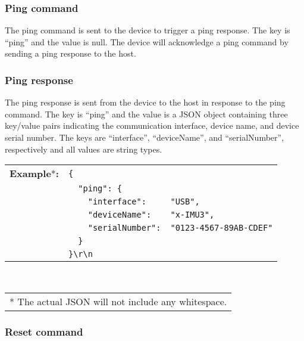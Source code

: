 \subsubsection{Ping command}

The ping command is sent to the device to trigger a ping response.  The key is \enquote{ping} and the value is null.  The device will acknowledge a ping command by sending a ping response to the host.


\subsubsection{Ping response}

The ping response is sent from the device to the host in response to the ping command.  The key is \enquote{ping} and the value is a \ac{JSON} object containing three key/value pairs indicating the communication interface, device name, and device serial number.  The keys are \enquote{interface}, \enquote{deviceName}, and \enquote{serialNumber}, respectively and all values are string types.

\begin{table}[H]
    \begin{tabular}{l l l}
        \textbf{Example}*\textbf{:} & \texttt{\{} \\
        & \texttt{~~"ping":~\{} & \\
        & \texttt{~~~~"interface":} & \texttt{"USB",} \\
        & \texttt{~~~~"deviceName":} & \texttt{"x-IMU3",} \\
        & \texttt{~~~~"serialNumber":} & \texttt{"0123-4567-89AB-CDEF"} \\
        & \texttt{~~\}} \\
        & \texttt{\}\textbackslash r\textbackslash n} \\
    \end{tabular} \\
    \begin{tabular}{l}
        \\
        \footnotesize{* The actual \acs{JSON} will not include any whitespace.}
    \end{tabular}
\end{table}

\subsubsection{Reset command}
\label{sec:resetCommand}

